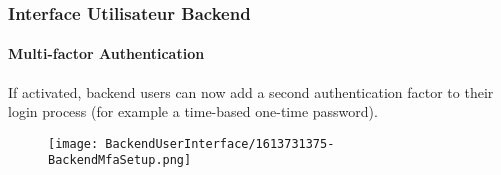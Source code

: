 %

\begin{frame}[fragile]
	\frametitle{Interface Utilisateur Backend}
	\framesubtitle{Multi-factor Authentication}

	If activated, backend users can now add a second authentication factor to
	their login process (for example a time-based one-time password).

	\begin{figure}
		\texttt{[image: BackendUserInterface/1613731375-BackendMfaSetup.png]}
	\end{figure}

\end{frame}

